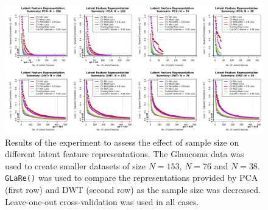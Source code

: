 \begin{figure}
    \centering
    \includegraphics[width=1\linewidth]{figures/eye-sample-size-results-results-01.pdf}
    \caption{Results of the experiment to assess the effect of sample size on different latent feature representations. The Glaucoma data was used to create smaller datasets of size $N=153$, $N=76$ and $N=38$. \texttt{GLaRe()} was used to compare the representations provided by PCA (first row) and DWT (second row) as the sample size was decreased. Leave-one-out cross-validation was used in all cases.}
    \label{fig:eye-sample-size-results-results-01}
\end{figure}